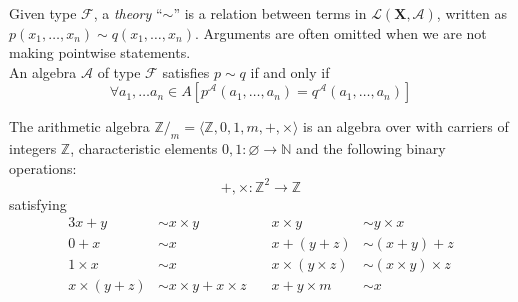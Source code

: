 \begin{defn}[Theory]
  Given type $\mathscr{F}$, a \emph{theory} ``$\sim$'' is a relation between terms
  in $\mathcal{L}(\textbf{X},\mathscr{A})$, written as $p(x_1, \ldots, x_n) \sim
  q(x_1, \ldots, x_n)$. Arguments are often omitted when we are not making
  pointwise statements.\\

  An algebra $\mathcal{A}$ of type $\mathscr{F}$ satisfies $p \sim q$ if and
  only if
  \[
    \forall a_1 , \ldots a_n \in A \left[ p^{\mathcal{A}}(a_1 , \ldots , a_n) =
      q^{\mathcal{A}}(a_1 , \ldots , a_n) \right]
  \]
\end{defn}

\begin{exa}\label{E:modz}
  The arithmetic algebra $\mathbb{Z}/_{m} = \langle \mathbb{Z} , 0, 1, m, +, \times \rangle$ is
  an algebra over with carriers of integers $\mathbb{Z}$, characteristic
  elements $0,1 : \varnothing \to \mathbb{N}$ and the following binary operations:
  \[
    +,  \times      : \mathbb{Z}^2 \to \mathbb{Z}
  \]
  satisfying
  \begin{alignat*}{3}
      x + y & \sim x \times y & x \times y & \sim y \times x\\
      0 + x & \sim x          & x + (y + z) & \sim (x + y) + z\\
      1 \times x & \sim x     & x \times (y \times z) & \sim (x \times y) \times z\\
      x \times (y + z) & \sim x \times y + x \times z \quad & x + y \times m & \sim x
  \end{alignat*}
\end{exa}

